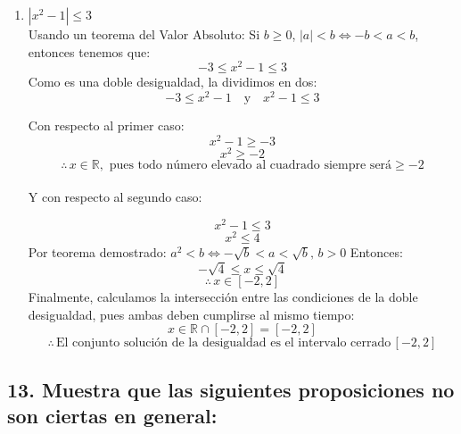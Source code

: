 \documentclass{article}
\begin{document}
\begin{enumerate}
  \item \(|x^2-1|\leq 3\)\\
Usando un teorema del Valor Absoluto:
Si \(b \geq 0\), \(|a| < b \iff -b < a < b\), entonces tenemos que:
\[
-3 \leq x^2 - 1 \leq 3
\]
Como es una doble desigualdad, la dividimos en dos:
\[
-3 \leq x^2 - 1 \quad \text{y} \quad x^2 - 1 \leq 3
\]

Con respecto al primer caso:
\[
x^2 - 1 \geq -3
\]
\[
x^2 \geq -2
\]
\[
\therefore \, x \in \mathbb{R}, \text{ pues todo número elevado al cuadrado siempre será} \geq -2
\]\\

Y con respecto al segundo caso:

\[
x^2 - 1 \leq 3
\]
\[
x^2 \leq 4
\]
Por teorema demostrado: \(a^2 < b \iff -\sqrt{b} < a < \sqrt{b}, \, b > 0\)
Entonces:
\[
-\sqrt{4} \leq x \leq \sqrt{4}
\]
\[
\therefore \, x \in [-2,2]
\]
Finalmente, calculamos la intersección entre las condiciones de la doble desigualdad, pues ambas deben cumplirse al mismo tiempo:
\[
x \in \mathbb{R} \cap [-2,2] = [-2,2]
\]
\[
\therefore \, \text{El conjunto solución de la desigualdad es el intervalo cerrado} \, [-2,2]
\]
\end{enumerate}

\subsection*{13.	Muestra que las siguientes proposiciones no son ciertas en general:}
\end{document}
